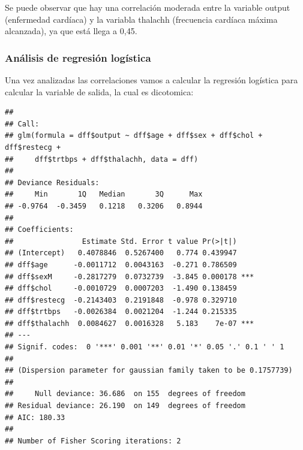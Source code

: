 \documentclass[
]{article}
\newenvironment{Shaded}{\begin{snugshade}}{\end{snugshade}}
\newcommand{\AttributeTok}[1]{\textcolor[rgb]{0.13,0.29,0.53}{#1}}
\newcommand{\FunctionTok}[1]{\textcolor[rgb]{0.13,0.29,0.53}{\textbf{#1}}}
\newcommand{\NormalTok}[1]{#1}
\newcommand{\OtherTok}[1]{\textcolor[rgb]{0.56,0.35,0.01}{#1}}
\newcommand{\SpecialCharTok}[1]{\textcolor[rgb]{0.81,0.36,0.00}{\textbf{#1}}}
\begin{document}
Se puede observar que hay una correlación moderada entre la variable
output (enfermedad cardíaca) y la variabla thalachh (frecuencia cardíaca
máxima alcanzada), ya que está llega a 0,45.

\hypertarget{anuxe1lisis-de-regresiuxf3n-loguxedstica}{%
\subsubsection{Análisis de regresión
logística}\label{anuxe1lisis-de-regresiuxf3n-loguxedstica}}

Una vez analizadas las correlaciones vamos a calcular la regresión
logística para calcular la variable de salida, la cual es dicotomica:

\begin{Shaded}
\end{Shaded}

\begin{verbatim}
## 
## Call:
## glm(formula = dff$output ~ dff$age + dff$sex + dff$chol + dff$restecg + 
##     dff$trtbps + dff$thalachh, data = dff)
## 
## Deviance Residuals: 
##     Min       1Q   Median       3Q      Max  
## -0.9764  -0.3459   0.1218   0.3206   0.8944  
## 
## Coefficients:
##                Estimate Std. Error t value Pr(>|t|)    
## (Intercept)   0.4078846  0.5267400   0.774 0.439947    
## dff$age      -0.0011712  0.0043163  -0.271 0.786509    
## dff$sexM     -0.2817279  0.0732739  -3.845 0.000178 ***
## dff$chol     -0.0010729  0.0007203  -1.490 0.138459    
## dff$restecg  -0.2143403  0.2191848  -0.978 0.329710    
## dff$trtbps   -0.0026384  0.0021204  -1.244 0.215335    
## dff$thalachh  0.0084627  0.0016328   5.183    7e-07 ***
## ---
## Signif. codes:  0 '***' 0.001 '**' 0.01 '*' 0.05 '.' 0.1 ' ' 1
## 
## (Dispersion parameter for gaussian family taken to be 0.1757739)
## 
##     Null deviance: 36.686  on 155  degrees of freedom
## Residual deviance: 26.190  on 149  degrees of freedom
## AIC: 180.33
## 
## Number of Fisher Scoring iterations: 2
\end{verbatim}
\end{document}
